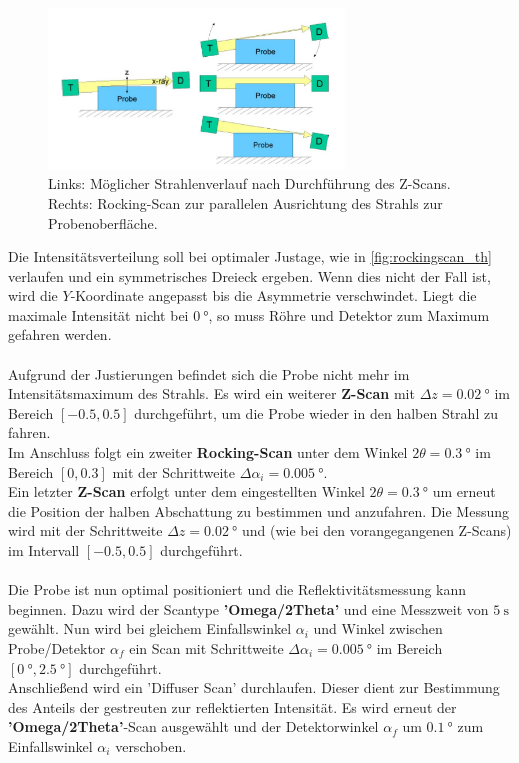 \begin{figure}
    \centering
    \includegraphics[width=0.7\textwidth]{content/data/rocking_zscan.jpg}
    \caption{Links: Möglicher Strahlenverlauf nach Durchführung des Z-Scans. \\ Rechts: Rocking-Scan zur parallelen Ausrichtung des Strahls zur Probenoberfläche.\cite[5]{anleitung}}
    \label{fig:rocking_zscan}
\end{figure}
Die Intensitätsverteilung soll bei optimaler Justage, wie in \autoref{fig:rockingscan_th} verlaufen und ein symmetrisches Dreieck ergeben.
Wenn dies nicht der Fall ist, wird die $Y$-Koordinate angepasst bis die Asymmetrie verschwindet.
Liegt die maximale Intensität nicht bei $\SI{0}{\degree}$, so muss Röhre und Detektor zum Maximum gefahren werden.
\\
\\
Aufgrund der Justierungen befindet sich die Probe nicht mehr im Intensitätsmaximum des Strahls.
Es wird ein weiterer \textbf{Z-Scan} mit $\Delta z = \SI{0.02}{\degree}$ im Bereich $[-0.5, 0.5]$ durchgeführt, um die Probe wieder in den halben Strahl zu fahren.
\\
Im Anschluss folgt ein zweiter \textbf{Rocking-Scan} unter dem Winkel $2 \theta = \SI{0.3}{\degree}$ im Bereich $[0, 0.3]$ mit der Schrittweite $\Delta \alpha_i = \SI{0.005}{\degree}$.
\\
Ein letzter \textbf{Z-Scan} erfolgt unter dem eingestellten Winkel $2 \theta = \SI{0.3}{\degree}$ um erneut die Position der halben Abschattung zu bestimmen und anzufahren.
Die Messung wird mit der Schrittweite $\Delta z = \SI{0.02}{\degree}$ und (wie bei den vorangegangenen Z-Scans) im Intervall $[-0.5, 0.5]$ durchgeführt.
\\
\\
Die Probe ist nun optimal positioniert und die Reflektivitätsmessung kann beginnen.
Dazu wird der Scantype \textbf{'Omega/2Theta'} und eine Messzweit von $\SI{5}{\second}$ gewählt.
Nun wird bei gleichem Einfallswinkel $\alpha_i$ und Winkel zwischen Probe/Detektor $\alpha_f$ ein Scan mit Schrittweite $\Delta \alpha_i = \SI{0.005}{\degree}$ im Bereich $[\SI{0}{\degree}, \SI{2.5}{\degree}]$ durchgeführt.
\\
Anschließend wird ein 'Diffuser Scan' durchlaufen.
Dieser dient zur Bestimmung des Anteils der gestreuten zur reflektierten Intensität.
Es wird erneut der \textbf{'Omega/2Theta'}-Scan ausgewählt und der Detektorwinkel $\alpha_f$ um $\SI{0.1}{\degree}$ zum Einfallswinkel $\alpha_i$ verschoben.
